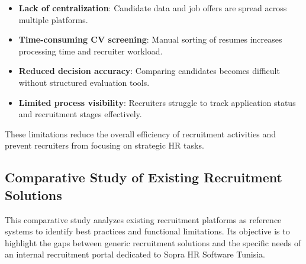 \begin{itemize}[label={-}]
    \item \textbf{Lack of centralization}: Candidate data and job offers are spread across multiple platforms.
    \item \textbf{Time-consuming CV screening}: Manual sorting of resumes increases processing time and recruiter workload.
    \item \textbf{Reduced decision accuracy}: Comparing candidates becomes difficult without structured evaluation tools.
    \item \textbf{Limited process visibility}: Recruiters struggle to track application status and recruitment stages effectively.
\end{itemize}

These limitations reduce the overall efficiency of recruitment activities and prevent recruiters from focusing on strategic HR tasks.

\subsection{Comparative Study of Existing Recruitment Solutions}

This comparative study analyzes existing recruitment platforms as reference systems to identify best practices and functional limitations. Its objective is to highlight the gaps between generic recruitment solutions and the specific needs of an internal recruitment portal dedicated to Sopra HR Software Tunisia.

